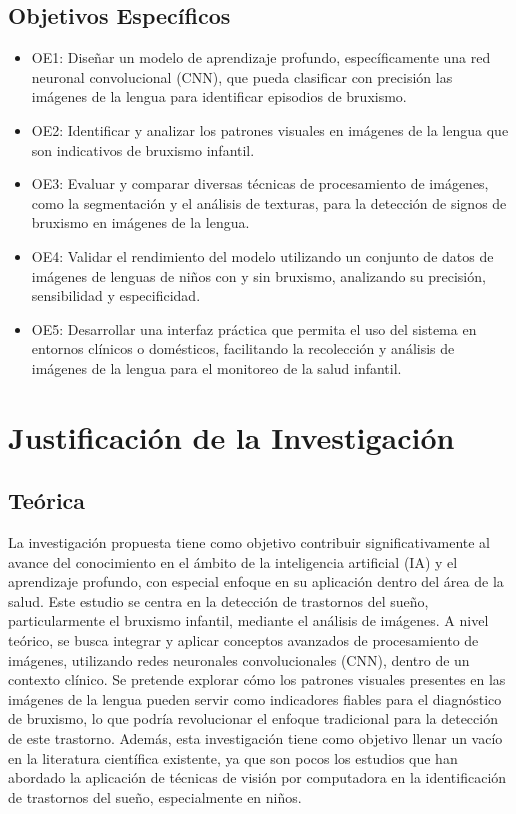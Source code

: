 \subsection{Objetivos Específicos}
\newcommand{\Objone}{
	Diseñar un modelo de aprendizaje profundo, específicamente una red neuronal convolucional (CNN), que pueda clasificar con precisión las imágenes de la lengua para identificar episodios de bruxismo.
	}
\newcommand{\Objtwo}{
	Identificar y analizar los patrones visuales en imágenes de la lengua que son indicativos de bruxismo infantil.
	}
\newcommand{\Objthree}{
	Evaluar y comparar diversas técnicas de procesamiento de imágenes, como la segmentación y el análisis de texturas, para la detección de signos de bruxismo en imágenes de la lengua.
	}
\newcommand{\Objfour}{
	Validar el rendimiento del modelo utilizando un conjunto de datos de imágenes de lenguas de niños con y sin bruxismo, analizando su precisión, sensibilidad y especificidad.
	}
\newcommand{\Objfive}{
	Desarrollar una interfaz práctica que permita el uso del sistema en entornos clínicos o domésticos, facilitando la recolección y análisis de imágenes de la lengua para el monitoreo de la salud infantil.
	} 

\begin{itemize}
	\item OE1: {\Objone}
	\item OE2: {\Objtwo}
	\item OE3: {\Objthree}
	\item OE4: {\Objfour}
	\item OE5: {\Objfive}
\end{itemize}



\section{Justificación de la Investigación}

\subsection{Teórica}
La investigación propuesta tiene como objetivo contribuir significativamente al avance del conocimiento en el ámbito de la inteligencia artificial (IA) y el aprendizaje profundo, con especial enfoque en su aplicación dentro del área de la salud. Este estudio se centra en la detección de trastornos del sueño, particularmente el bruxismo infantil, mediante el análisis de imágenes. A nivel teórico, se busca integrar y aplicar conceptos avanzados de procesamiento de imágenes, utilizando redes neuronales convolucionales (CNN), dentro de un contexto clínico. Se pretende explorar cómo los patrones visuales presentes en las imágenes de la lengua pueden servir como indicadores fiables para el diagnóstico de bruxismo, lo que podría revolucionar el enfoque tradicional para la detección de este trastorno. Además, esta investigación tiene como objetivo llenar un vacío en la literatura científica existente, ya que son pocos los estudios que han abordado la aplicación de técnicas de visión por computadora en la identificación de trastornos del sueño, especialmente en niños.

